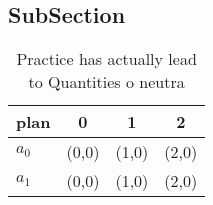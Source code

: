\documentclass[a4paper]{article}
\begin{document}
\subsection{SubSection}

\begin{table}
\begin{adjustbox}{width=0.5\columnwidth}
\begin{tabular}{|l|l|l|l|}
\hline
\textbf{plan} & \multicolumn{1}{c|}{\textbf{0}} & \multicolumn{1}{c|}{\textbf{1}} & \multicolumn{1}{c|}{\textbf{2}} \\ \hline
\textbf{$a_0$}  & (0,0) & (1,0) & (2,0) \\ \hline
\textbf{$a_1$}  & (0,0) & (1,0) & (2,0) \\ \hline
\end{tabular}
\end{adjustbox}
\caption{Practice has actually lead to Quantities o neutra
}
\end{table}
\end{document}
